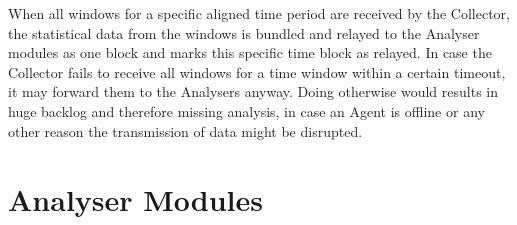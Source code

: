 When all windows for a specific aligned time period are received by the Collector, the statistical data from the windows is bundled and relayed to the Analyser modules as one block and marks this specific time block as relayed.
In case the Collector fails to receive all windows for a time window within a certain timeout, it may forward them to the Analysers anyway.
Doing otherwise would results in huge backlog and therefore missing analysis, in case an Agent is offline or any other reason the transmission of data might be disrupted.

\section{Analyser Modules}
\label{sec:concept:anal}


